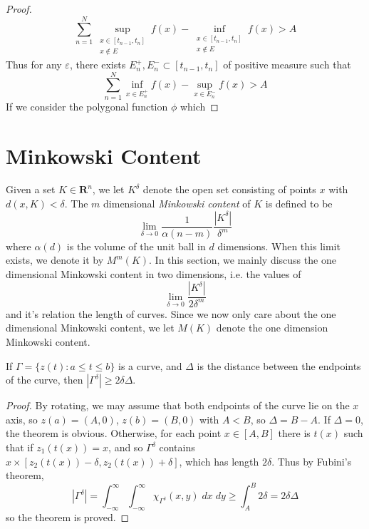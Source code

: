 \begin{proof}
  \[ \sum_{n = 1}^N \sup_{\substack{x \in [t_{n-1},t_n]\\x \not \in E}} f(x) - \inf_{\substack{x \in [t_{n-1},t_n]\\x \not \in E}} f(x) > A \]
  Thus for any $\varepsilon$, there exists $E_n^+, E_n^- \subset [t_{n-1},t_n]$ of positive measure such that
  \[ \sum_{n = 1}^N \inf_{x \in E_n^+} f(x) - \sup_{x \in E_n^-} f(x) > A \]
  If we consider the polygonal function $\phi$ which
\end{proof}

\section{Minkowski Content}

Given a set $K \in \mathbf{R}^n$, we let $K^\delta$ denote the open set consisting of points $x$ with $d(x,K) < \delta$. The $m$ dimensional \emph{Minkowski content} of $K$ is defined to be
%
\[ \lim_{\delta \to 0} \frac{1}{\alpha(n-m)} \frac{|K^\delta|}{\delta^m} \]
%
where $\alpha(d)$ is the volume of the unit ball in $d$ dimensions. When this limit exists, we denote it by $M^m(K)$. In this section, we mainly discuss the one dimensional Minkowski content in two dimensions, i.e. the values of
%
\[ \lim_{\delta \to 0} \frac{|K^\delta|}{2 \delta^m} \]
%
and it's relation the length of curves. Since we now only care about the one dimensional Minkowski content, we let $M(K)$ denote the one dimension Minkowski content.

\begin{lemma}
  If $\Gamma = \{ z(t): a \leq t \leq b \}$ is a curve, and $\Delta$ is the distance between the endpoints of the curve, then $|\Gamma^\delta| \geq 2 \delta \Delta$.
\end{lemma}
\begin{proof}
  By rotating, we may assume that both endpoints of the curve lie on the $x$ axis, so $z(a) = (A,0)$, $z(b) = (B,0)$ with $A < B$, so $\Delta = B - A$. If $\Delta = 0$, the theorem is obvious. Otherwise, for each point $x \in [A,B]$ there is $t(x)$ such that if $z_1(t(x)) = x$, and so $\Gamma^\delta$ contains $x \times [z_2(t(x)) - \delta, z_2(t(x)) + \delta]$, which has length $2 \delta$. Thus by Fubini's theorem,
  \[ |\Gamma^\delta| = \int_{-\infty}^\infty \int_{-\infty}^\infty \chi_{\Gamma^\delta}(x,y)\; dx \;dy \geq \int_A^B 2 \delta = 2 \delta \Delta \]
  so the theorem is proved.
\end{proof}


